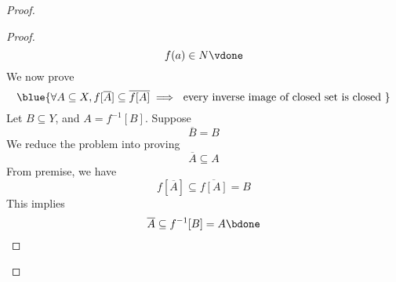 \documentclass{report}
\begin{document}
\begin{proof}
\begin{proof}
\begin{equation*}
f(a)\in N\vdone
\end{equation*}
We now prove 
\begin{equation*}
  \blue{\forall A\subseteq X, f[\overline{A}]\subseteq \overline{f[A]}\implies \text{ every inverse image of closed set is closed }}
\end{equation*}
Let $B\subseteq Y$, and $A=f^{-1}[B]$. Suppose
 \begin{equation*}
\overline{B}=B
\end{equation*}
We reduce the problem into proving
\begin{equation*}
\overline{A}\subseteq A
\end{equation*}
From premise, we have
\begin{equation*}
f[\overline{A}]\subseteq \overline{f[A]}=B
\end{equation*}
This implies
\begin{equation*}
\overline{A}\subseteq f^{-1}[B]=A\bdone
\end{equation*}







\end{proof}
\end{proof}
\end{document}
